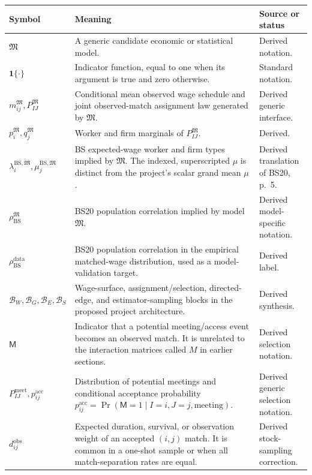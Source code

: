 \documentclass[11pt]{article}
\begin{document}
\begin{longtable}{p{}p{}p{}}
\textbf{Symbol} & \textbf{Meaning} & \textbf{Source or status} \\
\hline
\(\mathfrak M\) & A generic candidate economic or statistical model. &
Derived notation. \\
\(\mathbf{1}\{\cdot\}\) & Indicator function, equal to one when its argument
is true and zero otherwise. & Standard notation. \\
\(m^{\mathfrak M}_{ij},P^{\mathfrak M}_{IJ}\) & Conditional mean observed
wage schedule and joint observed-match assignment law generated by
\(\mathfrak M\). & Derived generic interface. \\
\(p_i^{\mathfrak M},q_j^{\mathfrak M}\) & Worker and firm marginals of
\(P^{\mathfrak M}_{IJ}\). & Derived. \\
\(\lambda_i^{\mathrm{BS},\mathfrak M},
\mu_j^{\mathrm{BS},\mathfrak M}\) & BS expected-wage worker and firm types
implied by \(\mathfrak M\).  The indexed, superscripted \(\mu\) is distinct
from the project's scalar grand mean \(\mu\). & Derived translation of
BS20, p.\ 5. \\
\(\rho_{\mathrm{BS}}^{\mathfrak M}\) & BS20 population correlation implied
by model \(\mathfrak M\). & Derived model-specific notation. \\
\(\rho_{\mathrm{BS}}^{\mathrm{data}}\) & BS20 population correlation in the
empirical matched-wage distribution, used as a model-validation target. &
Derived label. \\
\(\mathcal B_W,\mathcal B_G,\mathcal B_E,\mathcal B_S\) & Wage-surface,
assignment/selection, directed-edge, and estimator-sampling blocks in the
proposed project architecture. & Derived synthesis. \\
\(\mathsf M\) & Indicator that a potential meeting/access event becomes an
observed match.  It is unrelated to the interaction matrices called \(M\) in
earlier sections. & Derived selection notation. \\
\(P^{\mathrm{meet}}_{IJ},p^{\mathrm{acc}}_{ij}\) & Distribution of potential
meetings and
conditional acceptance probability
\(p^{\mathrm{acc}}_{ij}
=\Pr(\mathsf M=1\mid I=i,J=j,\text{meeting})\). & Derived generic
selection notation. \\
\(d_{ij}^{\mathrm{obs}}\) & Expected duration, survival, or observation
weight of an accepted \((i,j)\) match.  It is common in a one-shot sample or
when all match-separation rates are equal. & Derived stock-sampling
correction. \\

\end{longtable}
\end{document}
